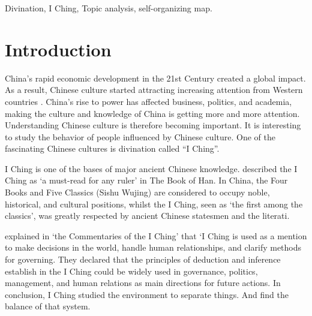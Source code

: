 \documentclass[conference]{IEEEtran}
\begin{document}

\maketitle

\begin{abstract}
...
\end{abstract}
\IEEEoverridecommandlockouts
\begin{keywords}
Divination, I Ching, Topic analysis, self-organizing map.
\end{keywords}

%
\IEEEpeerreviewmaketitle



\section{Introduction}
China’s rapid economic development in the 21st Century created a global impact. As a result, Chinese culture started attracting increasing attention from Western countries \cite{1}. China's rise to power has affected business, politics, and academia, making the culture and knowledge of China is getting more and more attention. Understanding Chinese culture is therefore becoming important. It is interesting to study the behavior of people influenced by Chinese culture. One of the fascinating Chinese cultures is divination called “I Ching”.

I Ching is one of the bases of major ancient Chinese knowledge.
\cite{2}described the I Ching as ‘a must-read for any ruler’ in The Book of Han. In China, the Four Books and Five Classics (Sishu Wujing) are considered to occupy noble, historical, and cultural positions, whilst the I Ching, seen as ‘the first among the classics’, was greatly respected by ancient Chinese statesmen and the literati.

\cite{3}explained in ‘the Commentaries of the I Ching’ that ‘I Ching is used as a mention to make decisions in the world, handle human relationships, and clarify methods for governing. They declared that the principles of deduction and inference establish in the I Ching could be widely used in governance, politics, management, and human relations as main directions for future actions.
In conclusion, I Ching studied the environment to separate things. And find the balance of that system.
\end{document}
